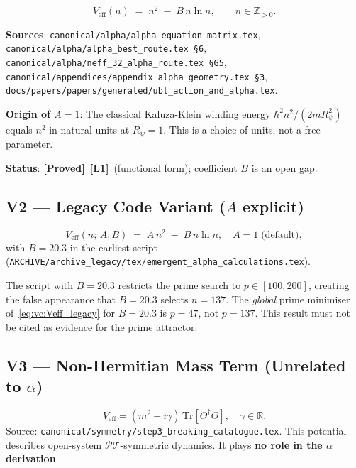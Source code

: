 \documentclass[12pt,a4paper]{article}
\theoremstyle{definition}
\theoremstyle{remark}
\newcommand{\RR}{\mathbb{R}}
\newcommand{\ZZ}{\mathbb{Z}}
\newcommand{\PROVED}{\textbf{[Proved]}}
\newcommand{\Lone}{\textbf{[L1]}}
\begin{document}
\begin{equation}
  \boxed{V_{\mathrm{eff}}(n) \;=\; n^2 \;-\; B\,n\ln n,}
  \qquad n \in \ZZ_{>0}.
  \label{eq:vc:Veff_canonical}
\end{equation}

\noindent\textbf{Sources}:
\texttt{canonical/alpha/alpha\_equation\_matrix.tex},
\texttt{canonical/alpha/alpha\_best\_route.tex~\S6},
\texttt{canonical/alpha/neff\_32\_alpha\_route.tex~\S G5},
\texttt{canonical/appendices/appendix\_alpha\_geometry.tex~\S3},
\texttt{docs/papers/papers/generated/ubt\_action\_and\_alpha.tex}.

\noindent\textbf{Origin of $A=1$}: The classical Kaluza-Klein winding energy
$\hbar^2n^2/(2mR_\psi^2)$ equals $n^2$ in natural units at $R_\psi = 1$.
This is a choice of units, not a free parameter.

\textbf{Status}: \PROVED~\Lone\ (functional form); coefficient $B$ is an open gap.

\subsection{V2 — Legacy Code Variant ($A$ explicit)}

\begin{equation}
  V_{\mathrm{eff}}(n;\,A,B) \;=\; A\,n^2 \;-\; B\,n\ln n,
  \quad A = 1\;\text{(default)},
  \label{eq:vc:Veff_legacy}
\end{equation}
with $B = 20.3$ in the earliest script
(\texttt{ARCHIVE/archive\_legacy/tex/emergent\_alpha\_calculations.tex}).

\begin{warnbox}
The script with $B = 20.3$ restricts the prime search to $p \in [100, 200]$,
creating the false appearance that $B = 20.3$ selects $n = 137$.
The \emph{global} prime minimiser of~\eqref{eq:vc:Veff_legacy} for $B = 20.3$
is $p = 47$, not $p = 137$.
This result must not be cited as evidence for the prime attractor.
\end{warnbox}

\subsection{V3 — Non-Hermitian Mass Term (Unrelated to $\alpha$)}

\begin{equation}
  V_{\mathrm{eff}} = (m^2 + i\gamma)\,\mathrm{Tr}[\Theta^\dagger\Theta],
  \quad \gamma \in \RR.
  \label{eq:vc:Veff_NH}
\end{equation}
Source: \texttt{canonical/symmetry/step3\_breaking\_catalogue.tex}.
This potential describes open-system $\mathcal{PT}$-symmetric dynamics.
It plays \textbf{no role in the $\alpha$ derivation}.
\end{document}
